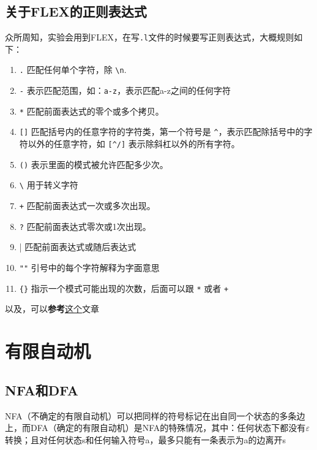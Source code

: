 \documentclass[]{report}
\begin{document}
		\subsection{关于FLEX的正则表达式}
		众所周知，实验会用到FLEX，在写\verb|.l|文件的时候要写正则表达式，大概规则如下：
		\begin{enumerate}
			\item \verb|.| 匹配任何单个字符，除 \verb|\n|.
			\item \verb|-| 表示匹配范围，如：\verb|a-z|，表示匹配a-z之间的任何字符
			\item \verb|*| 匹配前面表达式的零个或多个拷贝。
			\item \verb|[]| 匹配括号内的任意字符的字符类，第一个符号是 \verb|^|，表示匹配除括号中的字符以外的任意字符，如 \verb|[^/]| 表示除斜杠以外的所有字符。
			\item \verb|()| 表示里面的模式被允许匹配多少次。
			\item \verb|\| 用于转义字符
			\item \verb|+| 匹配前面表达式一次或多次出现。
			\item \verb|?| 匹配前面表达式零次或1次出现。
			\item \verb||| 匹配前面表达式或随后表达式
			\item \verb|""| 引号中的每个字符解释为字面意思
			\item \verb|{}| 指示一个模式可能出现的次数，后面可以跟 \verb|*| 或者 \verb|+|
		\end{enumerate}\par
		以及，可以\textbf{参考}\href{https://blog.csdn.net/u014594922/article/details/51224231}{这个}文章
	\section{有限自动机}
		\subsection{NFA和DFA}
		NFA（不确定的有限自动机）可以把同样的符号标记在出自同一个状态的多条边上，而DFA（确定的有限自动机）是NFA的特殊情况，其中：任何状态下都没有$\varepsilon$转换；且对任何状态s和任何输入符号a，最多只能有一条表示为a的边离开s
\end{document}
